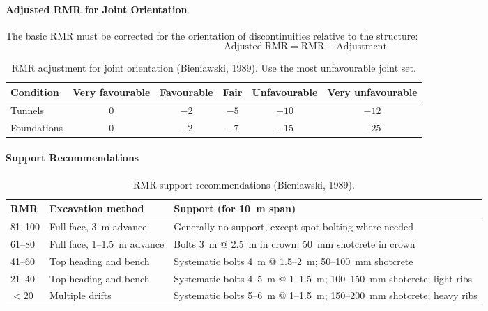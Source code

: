 \paragraph{Adjusted RMR for Joint Orientation}
The basic RMR must be corrected for the orientation of discontinuities relative to the structure:
\[
\mathrm{Adjusted\ RMR} = \mathrm{RMR} + \mathrm{Adjustment}
\]

\begin{table}[ht]
\centering
\begin{tabular}{lccccc}
\toprule
\textbf{Condition} & \textbf{Very favourable} & \textbf{Favourable} & \textbf{Fair} & \textbf{Unfavourable} & \textbf{Very unfavourable} \\
\midrule
Tunnels & 0 & $-2$ & $-5$ & $-10$ & $-12$ \\
Foundations & 0 & $-2$ & $-7$ & $-15$ & $-25$ \\
\bottomrule
\end{tabular}
\caption{RMR adjustment for joint orientation (Bieniawski, 1989). Use the most unfavourable joint set.}
\end{table}

\paragraph{Support Recommendations}

\begin{table}[ht]
\centering
\small
\begin{tabularx}{\textwidth}{l l X}
\toprule
\textbf{RMR} & \textbf{Excavation method} & \textbf{Support (for 10~m span)} \\
\midrule
81--100 & Full face, 3~m advance & Generally no support, except spot bolting where needed \\
61--80 & Full face, 1--1.5~m advance & Bolts 3~m @ 2.5~m in crown; 50~mm shotcrete in crown \\
41--60 & Top heading and bench & Systematic bolts 4~m @ 1.5--2~m; 50--100~mm shotcrete \\
21--40 & Top heading and bench & Systematic bolts 4--5~m @ 1--1.5~m; 100--150~mm shotcrete; light ribs \\
$<20$ & Multiple drifts & Systematic bolts 5--6~m @ 1--1.5~m; 150--200~mm shotcrete; heavy ribs \\
\bottomrule
\end{tabularx}
\caption{RMR support recommendations (Bieniawski, 1989).}
\end{table}

